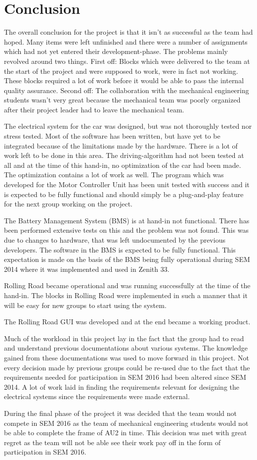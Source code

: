 \chapter{Conclusion}
The overall conclusion for the project is that it isn't as successful as the team had hoped. Many items were left unfinished and there were a number of assignments which had not yet entered their development-phase. The problems mainly revolved around two things. First off: Blocks which were delivered to the team at the start of the project and were supposed to work, were in fact not working. These blocks required a lot of work before it would be able to pass the internal quality assurance. Second off: The collaboration with the mechanical engineering students wasn't very great because the mechanical team was poorly organized after their project leader had to leave the mechanical team.

The electrical system for the car was designed, but was not thoroughly tested nor stress tested. Most of the software has been written, but have yet to be integrated because of the limitations made by the hardware. There is a lot of work left to be done in this area. The driving-algorithm had not been tested at all and at the time of this hand-in, no optimization of the car had been made. The optimization contains a lot of work as well. The program which was developed for the Motor Controller Unit has been unit tested with success and it is expected to be fully functional and should simply be a plug-and-play feature for the next group working on the project. 

The Battery Management System (BMS) is at hand-in not functional. There has been performed extensive tests on this and the problem was not found. This was due to changes to hardware, that was left undocumented by the previous developers. The software in the BMS is expected to be fully functional. This expectation is made on the basis of the BMS being fully operational during SEM 2014 where it was implemented and used in Zenith 33.

Rolling Road became operational and was running successfully at the time of the hand-in. The blocks in Rolling Road were implemented in such a manner that it will be easy for new groups to start using the system. 

The Rolling Road GUI was developed and at the end became a working product.

Much of the workload in this project lay in the fact that the group had to read and understand previous documentations about various systems. The knowledge gained from these documentations was used to move forward in this project. Not every decision made by previous groups could be re-used due to the fact that the requirements needed for participation in SEM 2016 had been altered since SEM 2014. A lot of work laid in finding the requirements relevant for designing the electrical systems since the requirements were made external.

During the final phase of the project it was decided that the team would not compete in SEM 2016 as the team of mechanical engineering students would not be able to complete the frame of AU2 in time. This decision was met with great regret as the team will not be able see their work pay off in the form of participation in SEM 2016.
